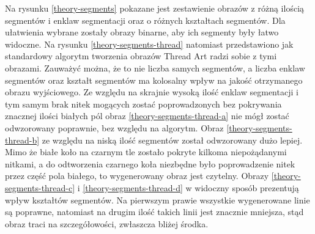 \documentclass[a4paper, 12pt, polish, twoside]{extreport}
\begin{document}
        Na rysunku \ref{theory-segments} pokazane jest zestawienie obrazów z różną ilością segmentów i enklaw segmentacji oraz o różnych kształtach segmentów. Dla ułatwienia wybrane zostały obrazy binarne, aby ich segmenty były łatwo widoczne. Na rysunku \ref{theory-segments-thread} natomiast przedstawiono jak standardowy algorytm tworzenia obrazów Thread Art radzi sobie z tymi obrazami. Zauważyć można, że to nie liczba samych segmentów, a liczba enklaw segmentów oraz kształt segmentów ma kolosalny wpływ na jakość otrzymanego obrazu wyjściowego. Ze względu na skrajnie wysoką ilość enklaw segmentacji i tym samym brak nitek mogących zostać poprowadzonych bez pokrywania znacznej ilości białych pól obraz \ref{theory-segments-thread-a} nie mógł zostać odwzorowany poprawnie, bez względu na algorytm. Obraz \ref{theory-segments-thread-b} ze względu na niską ilość segmentów został odwzorowany dużo lepiej. Mimo że białe koło na czarnym tle zostało pokryte kilkoma niepożądanymi nitkami, a do odtworzenia czarnego koła niezbędne było poprowadzenie nitek przez część pola białego, to wygenerowany obraz jest czytelny. Obrazy \ref{theory-segments-thread-c} i \ref{theory-segments-thread-d} w widoczny sposób prezentują wpływ kształtów segmentów. Na pierwszym prawie wszystkie wygenerowane linie są poprawne, natomiast na drugim ilość takich linii jest znacznie mniejsza, stąd obraz traci na szczegółowości, zwłaszcza bliżej środka.
        
\end{document}
